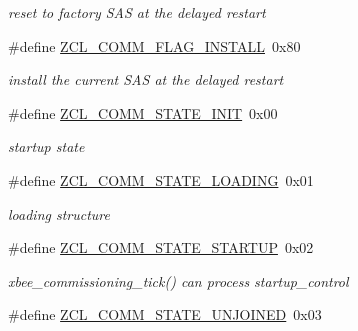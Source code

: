 \begin{DoxyCompactItemize}
\begin{DoxyCompactList}\small\item\em reset to factory S\-A\-S at the delayed restart \end{DoxyCompactList}\item 
\hypertarget{group__zcl__commissioning_gaf041a27755c9719134f8a2ad59f124e3}{\#define \hyperlink{group__zcl__commissioning_gaf041a27755c9719134f8a2ad59f124e3}{Z\-C\-L\-\_\-\-C\-O\-M\-M\-\_\-\-F\-L\-A\-G\-\_\-\-I\-N\-S\-T\-A\-L\-L}~0x80}\label{group__zcl__commissioning_gaf041a27755c9719134f8a2ad59f124e3}

\begin{DoxyCompactList}\small\item\em install the current S\-A\-S at the delayed restart \end{DoxyCompactList}\item 
\hypertarget{group__zcl__commissioning_gabf17d49005afcefa60714a10c1c54c74}{\#define \hyperlink{group__zcl__commissioning_gabf17d49005afcefa60714a10c1c54c74}{Z\-C\-L\-\_\-\-C\-O\-M\-M\-\_\-\-S\-T\-A\-T\-E\-\_\-\-I\-N\-I\-T}~0x00}\label{group__zcl__commissioning_gabf17d49005afcefa60714a10c1c54c74}

\begin{DoxyCompactList}\small\item\em startup state \end{DoxyCompactList}\item 
\hypertarget{group__zcl__commissioning_ga44abce1dcc61c33053dffe8641e4b167}{\#define \hyperlink{group__zcl__commissioning_ga44abce1dcc61c33053dffe8641e4b167}{Z\-C\-L\-\_\-\-C\-O\-M\-M\-\_\-\-S\-T\-A\-T\-E\-\_\-\-L\-O\-A\-D\-I\-N\-G}~0x01}\label{group__zcl__commissioning_ga44abce1dcc61c33053dffe8641e4b167}

\begin{DoxyCompactList}\small\item\em loading structure \end{DoxyCompactList}\item 
\hypertarget{group__zcl__commissioning_ga03c5eb470ac12387be9e3e48953750f5}{\#define \hyperlink{group__zcl__commissioning_ga03c5eb470ac12387be9e3e48953750f5}{Z\-C\-L\-\_\-\-C\-O\-M\-M\-\_\-\-S\-T\-A\-T\-E\-\_\-\-S\-T\-A\-R\-T\-U\-P}~0x02}\label{group__zcl__commissioning_ga03c5eb470ac12387be9e3e48953750f5}

\begin{DoxyCompactList}\small\item\em xbee\-\_\-commissioning\-\_\-tick() can process startup\-\_\-control \end{DoxyCompactList}\item 
\hypertarget{group__zcl__commissioning_ga60e0581b929ae09262680136205a2516}{\#define \hyperlink{group__zcl__commissioning_ga60e0581b929ae09262680136205a2516}{Z\-C\-L\-\_\-\-C\-O\-M\-M\-\_\-\-S\-T\-A\-T\-E\-\_\-\-U\-N\-J\-O\-I\-N\-E\-D}~0x03}\label{group__zcl__commissioning_ga60e0581b929ae09262680136205a2516}


\end{DoxyCompactItemize}
